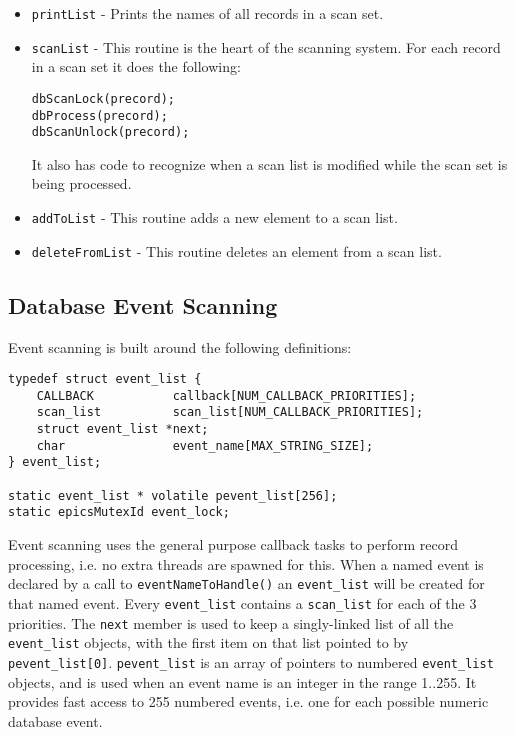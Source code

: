 \begin{itemize}
\item \verb|printList| - Prints the names of all records in a scan set.

\item \verb|scanList| - This routine is the heart of the scanning system.
For each record in a scan set it does the following:

\begin{verbatim}
dbScanLock(precord);
dbProcess(precord);
dbScanUnlock(precord);
\end{verbatim}

It also has code to recognize when a scan list is modified while the scan set is being processed.

\item \verb|addToList| - This routine adds a new element to a scan list.

\item \verb|deleteFromList| - This routine deletes an element from a scan list.

\end{itemize}

\subsection{Database Event Scanning}

Event scanning is built around the following definitions:

\begin{verbatim}
typedef struct event_list {
    CALLBACK           callback[NUM_CALLBACK_PRIORITIES];
    scan_list          scan_list[NUM_CALLBACK_PRIORITIES];
    struct event_list *next;
    char               event_name[MAX_STRING_SIZE];
} event_list;

static event_list * volatile pevent_list[256];
static epicsMutexId event_lock;
\end{verbatim}

Event scanning uses the general purpose callback tasks to perform record processing, i.e. no extra threads are spawned for this.
When a named event is declared by a call to \verb|eventNameToHandle()| an \verb|event_list| will be created for that named event.
Every \verb|event_list| contains a \verb|scan_list| for each of the 3 priorities.
The \verb|next| member is used to keep a singly-linked list of all the \verb|event_list| objects, with the first item on that list pointed to by \verb|pevent_list[0]|.
\verb|pevent_list| is an array of pointers to numbered \verb|event_list| objects, and is used when an event name is an integer in the range 1..255.
It provides fast access to 255 numbered events, i.e. one for each possible numeric database event.

